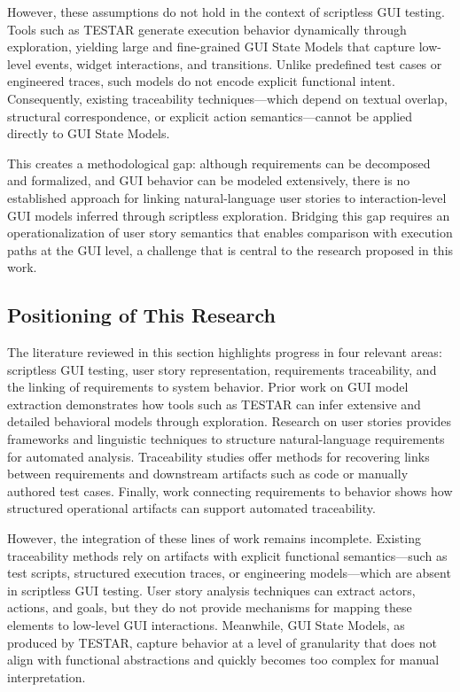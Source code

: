 \documentclass{ou-report-vaf}
\begin{document}
However, these assumptions do not hold in the context of scriptless GUI testing. Tools such as TESTAR generate execution behavior dynamically through exploration, yielding large and fine-grained GUI State Models that capture low-level events, widget interactions, and transitions. Unlike predefined test cases or engineered traces, such models do not encode explicit functional intent. Consequently, existing traceability techniques—which depend on textual overlap, structural correspondence, or explicit action semantics—cannot be applied directly to GUI State Models.

This creates a methodological gap: although requirements can be decomposed and formalized, and GUI behavior can be modeled extensively, there is no established approach for linking natural-language user stories to interaction-level GUI models inferred through scriptless exploration. Bridging this gap requires an operationalization of user story semantics that enables comparison with execution paths at the GUI level, a challenge that is central to the research proposed in this work.

\subsection{Positioning of This Research}
\label{subsec:positioning}

The literature reviewed in this section highlights progress in four relevant areas: scriptless GUI testing, user story representation, requirements traceability, and the linking of requirements to system behavior. Prior work on GUI model extraction demonstrates how tools such as TESTAR can infer extensive and detailed behavioral models through exploration. Research on user stories provides frameworks and linguistic techniques to structure natural-language requirements for automated analysis. Traceability studies offer methods for recovering links between requirements and downstream artifacts such as code or manually authored test cases. Finally, work connecting requirements to behavior shows how structured operational artifacts can support automated traceability.

However, the integration of these lines of work remains incomplete. Existing traceability methods rely on artifacts with explicit functional semantics—such as test scripts, structured execution traces, or engineering models—which are absent in scriptless GUI testing. User story analysis techniques can extract actors, actions, and goals, but they do not provide mechanisms for mapping these elements to low-level GUI interactions. Meanwhile, GUI State Models, as produced by TESTAR, capture behavior at a level of granularity that does not align with functional abstractions and quickly becomes too complex for manual interpretation.
\end{document}
